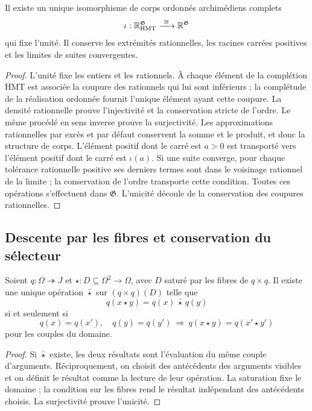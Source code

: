 \begin{proposition}
\label{hmtfg:carta-interna}
Il existe un unique isomorphisme de corps ordonnés archimédiens complets
\[
 \iota:\mathbb R_{\rm HMT}^{\mathfrak G}
             \xrightarrow{\ \cong\ }\mathbb R^{\mathfrak G}
\]
qui fixe l’unité. Il conserve les extrémités rationnelles, les racines carrées positives et les limites de suites convergentes.
\end{proposition}
\begin{proof}
L’unité fixe les entiers et les rationnels. À chaque élément de la complétion HMT est associée la coupure des rationnels qui lui sont inférieurs ; la complétude de la réalisation ordonnée fournit l’unique élément ayant cette coupure. La densité rationnelle prouve l’injectivité et la conservation stricte de l’ordre. Le même procédé en sens inverse prouve la surjectivité. Les approximations rationnelles par excès et par défaut conservent la somme et le produit, et donc la structure de corps. L’élément positif dont le carré est \(a>0\) est transporté vers l’élément positif dont le carré est \(\iota(a)\). Si une suite converge, pour chaque tolérance rationnelle positive ses derniers termes sont dans le voisinage rationnel de la limite ; la conservation de l’ordre transporte cette condition. Toutes ces opérations s’effectuent dans \(\mathfrak G\). L’unicité découle de la conservation des coupures rationnelles.
\end{proof}

\subsection{Descente par les fibres et conservation du sélecteur}
\label{hmtfg:descenso-selector}

\begin{proposition}
\label{hmtfg:criterio-descenso}
Soient \(q:\Omega\twoheadrightarrow J\) et
\(\star:D\subseteq\Omega^2\to\Omega\), avec \(D\) saturé par les fibres de \(q\times q\). Il existe une unique opération \(\bar\star\) sur \((q\times q)(D)\) telle que
\[
 q(x\star y)=q(x)\,\bar\star\,q(y)
\]
si et seulement si
\[
 q(x)=q(x'),\quad q(y)=q(y')
 \ \Longrightarrow\ q(x\star y)=q(x'\star y')
\]
pour les couples du domaine.
\end{proposition}
\begin{proof}
Si \(\bar\star\) existe, les deux résultats sont l’évaluation du même couple d’arguments. Réciproquement, on choisit des antécédents des arguments visibles et on définit le résultat comme la lecture de leur opération. La saturation fixe le domaine ; la condition sur les fibres rend le résultat indépendant des antécédents choisis. La surjectivité prouve l’unicité.
\end{proof}

